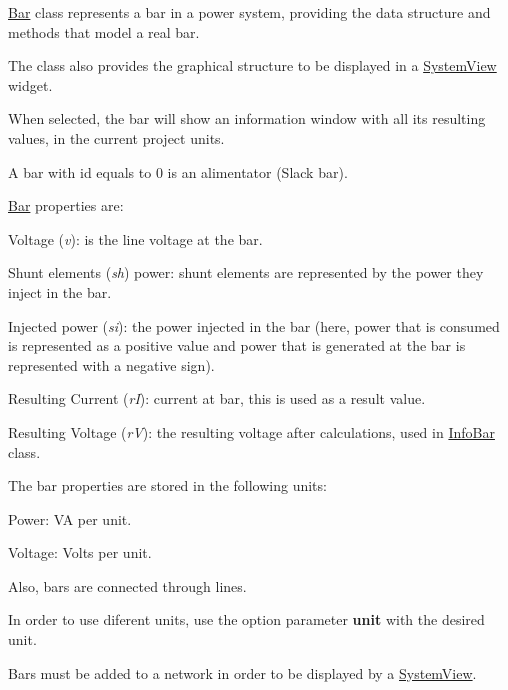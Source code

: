\hyperlink{class_bar}{Bar} class represents a bar in a power system, providing the data structure and methods that model a real bar.

The class also provides the graphical structure to be displayed in a \hyperlink{class_system_view}{System\+View} widget.

When selected, the bar will show an information window with all its resulting values, in the current project units.

A bar with id equals to 0 is an alimentator (Slack bar).

\hyperlink{class_bar}{Bar} properties are\+:
\begin{DoxyItemize}
\item Voltage ({\itshape v})\+: is the line voltage at the bar.
\item Shunt elements ({\itshape sh}) power\+: shunt elements are represented by the power they inject in the bar.
\item Injected power ({\itshape si})\+: the power injected in the bar (here, power that is consumed is represented as a positive value and power that is generated at the bar is represented with a negative sign).
\item Resulting Current ({\itshape r\+I})\+: current at bar, this is used as a result value.
\item Resulting Voltage ({\itshape r\+V})\+: the resulting voltage after calculations, used in \hyperlink{class_info_bar}{Info\+Bar} class.
\end{DoxyItemize}

The bar properties are stored in the following units\+:
\begin{DoxyItemize}
\item Power\+: V\+A per unit.
\item Voltage\+: Volts per unit.
\end{DoxyItemize}

Also, bars are connected through lines.

In order to use diferent units, use the option parameter {\bfseries unit} with the desired unit.

Bars must be added to a network in order to be displayed by a \hyperlink{class_system_view}{System\+View}.

